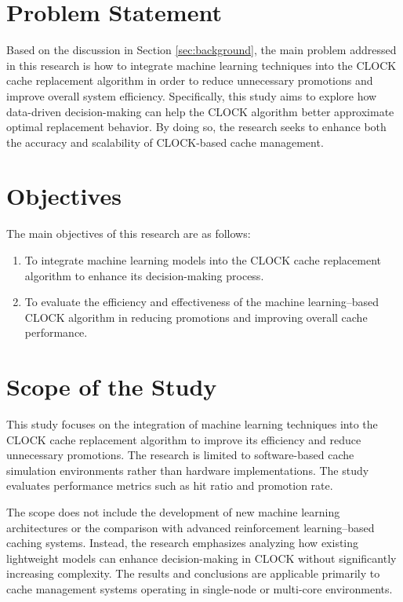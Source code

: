 \section{Problem Statement}
\label{sec:problem}

Based on the discussion in Section \ref{sec:background}, the main
problem addressed in this research is how to integrate machine
learning techniques into the CLOCK cache replacement algorithm in
order to reduce unnecessary promotions and improve overall system
efficiency. Specifically, this study aims to explore how data-driven
decision-making can help the CLOCK algorithm better approximate
optimal replacement behavior. By doing so, the research seeks to
enhance both the accuracy and scalability of CLOCK-based cache management.

\section{Objectives}
\label{sec:Tujuan}

The main objectives of this research are as follows:

\begin{enumerate}[nolistsep]
  \item To integrate machine learning models into the CLOCK cache
    replacement algorithm to enhance its decision-making process.
  \item To evaluate the efficiency and effectiveness of the machine
    learning–based CLOCK algorithm in reducing promotions and
    improving overall cache performance.
\end{enumerate}

\section{Scope of the Study}
\label{sec:scope}

This study focuses on the integration of machine learning techniques
into the CLOCK cache replacement algorithm to improve its efficiency
and reduce unnecessary promotions. The research is limited to
software-based cache simulation environments rather than hardware
implementations. The study evaluates performance metrics such as hit
ratio and promotion rate.

The scope does not include the development of new machine learning
architectures or the comparison with advanced reinforcement
learning–based caching systems. Instead, the research emphasizes
analyzing how existing lightweight models can enhance decision-making
in CLOCK without significantly increasing complexity. The results and
conclusions are applicable primarily to cache management systems
operating in single-node or multi-core environments.

